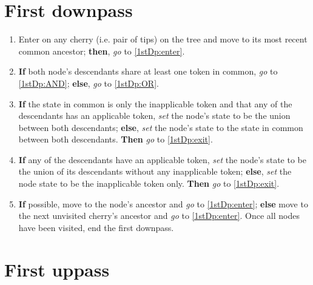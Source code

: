 \documentclass[a4paper,12pt]{article}
\begin{document}

\section{First downpass} \label{1stDp}


\begin{enumerate}
    \item Enter on any cherry (i.e. pair of tips) on the tree and move to its most recent common ancestor; \textbf{then}, \textit{go} to \ref{1stDp:enter}.
    \item \label{1stDp:enter} \textbf{If} both node's descendants share at least one token in common, \textit{go} to \ref{1stDp:AND}; \textbf{else}, \textit{go} to \ref{1stDp:OR}.
    \item \label{1stDp:AND} \textbf{If} the state in common is only the inapplicable token and that any of the descendants has an applicable token, \textit{set} the node's state to be the union between both descendants; \textbf{else}, \textit{set} the node's state to the state in common between both descendants. \textbf{Then} \textit{go} to \ref{1stDp:exit}.  
    \item \label{1stDp:OR} \textbf{If} any of the descendants have an applicable token, \textit{set} the node's state to be the union of its descendants without any inapplicable token; \textbf{else}, \textit{set} the node state to be the inapplicable token only. \textbf{Then} \textit{go} to \ref{1stDp:exit}.
    \item \label{1stDp:exit} \textbf{If} possible, move to the node's ancestor and \textit{go} to \ref{1stDp:enter}; \textbf{else} move to the next unvisited cherry's ancestor and \textit{go} to \ref{1stDp:enter}. Once all nodes have been visited, end the first downpass.
\end{enumerate}

\section{First uppass} \label{1stUp}
\end{document}
